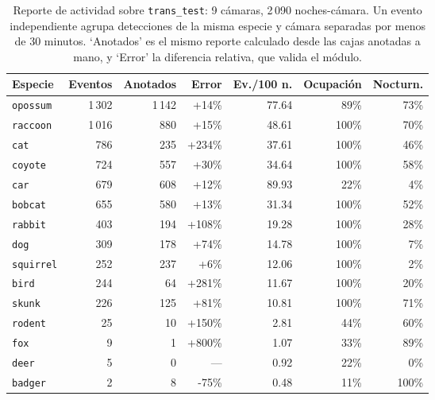 \begin{table}[t]
  \centering
  \footnotesize
  \begin{tabular}{lrrrrrr}
    \toprule
    Especie & Eventos & Anotados & Error & Ev./100 n. & Ocupación & Nocturn. \\
    \midrule
    \texttt{opossum} & 1\,302 & 1\,142 & +14\% & 77.64 & 89\% & 73\% \\
    \texttt{raccoon} & 1\,016 & 880 & +15\% & 48.61 & 100\% & 70\% \\
    \texttt{cat} & 786 & 235 & +234\% & 37.61 & 100\% & 46\% \\
    \texttt{coyote} & 724 & 557 & +30\% & 34.64 & 100\% & 58\% \\
    \texttt{car} & 679 & 608 & +12\% & 89.93 & 22\% & 4\% \\
    \texttt{bobcat} & 655 & 580 & +13\% & 31.34 & 100\% & 52\% \\
    \texttt{rabbit} & 403 & 194 & +108\% & 19.28 & 100\% & 28\% \\
    \texttt{dog} & 309 & 178 & +74\% & 14.78 & 100\% & 7\% \\
    \texttt{squirrel} & 252 & 237 & +6\% & 12.06 & 100\% & 2\% \\
    \texttt{bird} & 244 & 64 & +281\% & 11.67 & 100\% & 20\% \\
    \texttt{skunk} & 226 & 125 & +81\% & 10.81 & 100\% & 71\% \\
    \texttt{rodent} & 25 & 10 & +150\% & 2.81 & 44\% & 60\% \\
    \texttt{fox} & 9 & 1 & +800\% & 1.07 & 33\% & 89\% \\
    \texttt{deer} & 5 & 0 & --- & 0.92 & 22\% & 0\% \\
    \texttt{badger} & 2 & 8 & -75\% & 0.48 & 11\% & 100\% \\
    \bottomrule
  \end{tabular}
  \caption{Reporte de actividad sobre \texttt{trans\_test}: 9 cámaras, 2\,090 noches-cámara. Un evento independiente agrupa detecciones de la misma especie y cámara separadas por menos de 30 minutos. `Anotados' es el mismo reporte calculado desde las cajas anotadas a mano, y `Error' la diferencia relativa, que valida el módulo.}
  \label{tab:actividad_trans}
\end{table}
